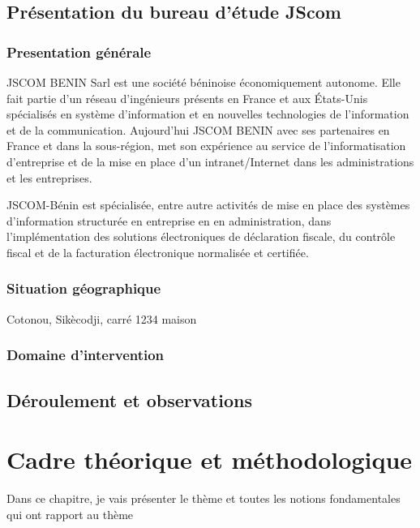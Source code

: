 \documentclass[a4paper,12pt,french]{report} %
\begin{document}
	\section{Présentation du bureau d'étude JScom}
		\subsection{Presentation générale}
		JSCOM BENIN Sarl est une société béninoise économiquement autonome. Elle fait partie d'un réseau d'ingénieurs présents en France et aux États-Unis spécialisés en système d'information et en nouvelles technologies de l'information et de la communication. Aujourd'hui JSCOM BENIN avec ses partenaires en France et dans la sous-région, met son expérience au service de l'informatisation d'entreprise et de la mise en place d'un intranet/Internet dans les administrations et les entreprises.

JSCOM-Bénin est spécialisée, entre autre activités de mise en place des systèmes d'information structurée en entreprise en en administration, dans l'implémentation des solutions électroniques de déclaration fiscale, du contrôle fiscal et de la facturation électronique normalisée et certifiée.
		\subsection{Situation géographique}
		Cotonou, Sikècodji, carré 1234 maison
		\begin{figure}
		
		\label{Carte de JScom}
		\end{figure}
		\subsection{Domaine d'intervention}
		
	\section{Déroulement et observations}
		
\chapter{Cadre théorique et méthodologique}
	Dans ce chapitre, je vais présenter le thème et toutes les notions fondamentales qui ont rapport au thème 
\end{document}
